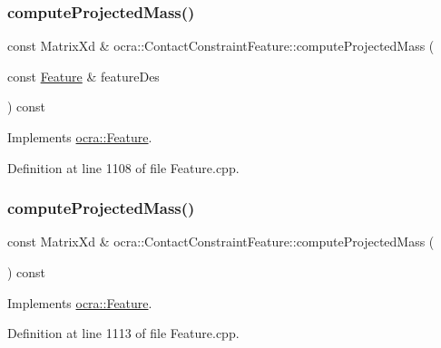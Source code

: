 \subsubsection{\texorpdfstring{compute\+Projected\+Mass()}{computeProjectedMass()}\hspace{0.1cm}{\footnotesize\ttfamily [1/2]}}
{\footnotesize\ttfamily const Matrix\+Xd \& ocra\+::\+Contact\+Constraint\+Feature\+::compute\+Projected\+Mass (\begin{DoxyParamCaption}\item[{const \hyperlink{classocra_1_1Feature}{Feature} \&}]{feature\+Des }\end{DoxyParamCaption}) const\hspace{0.3cm}{\ttfamily [virtual]}}



Implements \hyperlink{classocra_1_1Feature_a44e11dd349e92971fefebff354e7214b}{ocra\+::\+Feature}.



Definition at line 1108 of file Feature.\+cpp.

\hypertarget{classocra_1_1ContactConstraintFeature_ab926340d6c6d00b1358ae99432e15398}{}\label{classocra_1_1ContactConstraintFeature_ab926340d6c6d00b1358ae99432e15398} 
\subsubsection{\texorpdfstring{compute\+Projected\+Mass()}{computeProjectedMass()}\hspace{0.1cm}{\footnotesize\ttfamily [2/2]}}
{\footnotesize\ttfamily const Matrix\+Xd \& ocra\+::\+Contact\+Constraint\+Feature\+::compute\+Projected\+Mass (\begin{DoxyParamCaption}{ }\end{DoxyParamCaption}) const\hspace{0.3cm}{\ttfamily [virtual]}}



Implements \hyperlink{classocra_1_1Feature_a99ac023809c0cf34b5d582537934b08c}{ocra\+::\+Feature}.



Definition at line 1113 of file Feature.\+cpp.

\hypertarget{classocra_1_1ContactConstraintFeature_a9bdfabb746abff207ff9cc3e9c968c81}{}\label{classocra_1_1ContactConstraintFeature_a9bdfabb746abff207ff9cc3e9c968c81} 
